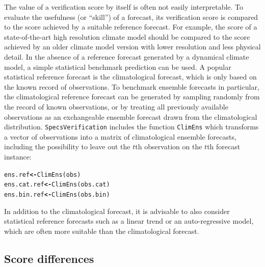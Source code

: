 \documentclass[10pt]{article}\usepackage[]{graphicx}\usepackage[]{color}
\makeatletter
\newcommand{\hlstd}[1]{\textcolor[rgb]{0,0,0}{#1}}%
\newcommand{\hlkwb}[1]{\textcolor[rgb]{0.502,0.502,0.753}{\textbf{#1}}}%
\newcommand{\hlkwd}[1]{\textcolor[rgb]{0,0.267,0.4}{#1}}%
\newenvironment{kframe}{%
 \def\at@end@of@kframe{}%
 \ifinner\ifhmode%
  \def\at@end@of@kframe{\end{minipage}}%
  \begin{minipage}{\columnwidth}%
 \fi\fi%
 \def\FrameCommand##1{\hskip\@totalleftmargin \hskip-\fboxsep
 \colorbox{shadecolor}{##1}\hskip-\fboxsep
     \hskip-\linewidth \hskip-\@totalleftmargin \hskip\columnwidth}%
 \MakeFramed {\advance\hsize-\width
   \@totalleftmargin\z@ \linewidth\hsize
   \@setminipage}}%
 {\par\unskip\endMakeFramed%
 \at@end@of@kframe}
\newenvironment{knitrout}{}{} %
\newcommand{\pkg}[1]{\texttt{#1}}
\newcommand{\code}[1]{\texttt{#1}}
\makeatother
\begin{document}
The value of a verification score by itself is often not easily interpretable.
To evaluate the usefulness (or ``skill'') of a forecast, its verification score is compared to the score achieved by a suitable reference forecast.
For example, the score of a state-of-the-art high resolution climate model should be compared to the score achieved by an older climate model version with lower resolution and less physical detail.
In the absence of a reference forecast generated by a dynamical climate model, a simple statistical benchmark prediction can be used.
A popular statistical reference forecast is the climatological forecast, which is only based on the known record of observations.
To benchmark ensemble forecasts in particular, the climatological reference forecast can be generated by sampling randomly from the record of known observations, or by treating all previously available observations as an exchangeable ensemble forecast drawn from the climatological distribution.
\pkg{SpecsVerification} includes the function \code{ClimEns} which transforms a vector of observations into a matrix of climatological ensemble forecasts, including the possibility to leave out the $t$th observation on the $t$th forecast instance:
%
\begin{knitrout}
\color{fgcolor}\begin{kframe}
\begin{alltt}
\hlstd{ens.ref}     \hlkwb{<-} \hlkwd{ClimEns}\hlstd{(obs)}
\hlstd{ens.cat.ref} \hlkwb{<-} \hlkwd{ClimEns}\hlstd{(obs.cat)}
\hlstd{ens.bin.ref} \hlkwb{<-} \hlkwd{ClimEns}\hlstd{(obs.bin)}
\end{alltt}
\end{kframe}
\end{knitrout}
%
In addition to the climatological forecast, it is advisable to also consider statistical reference forecasts such as a linear trend or an auto-regressive model, which are often more suitable than the climatological forecast.



\subsection{Score differences}
\end{document}
